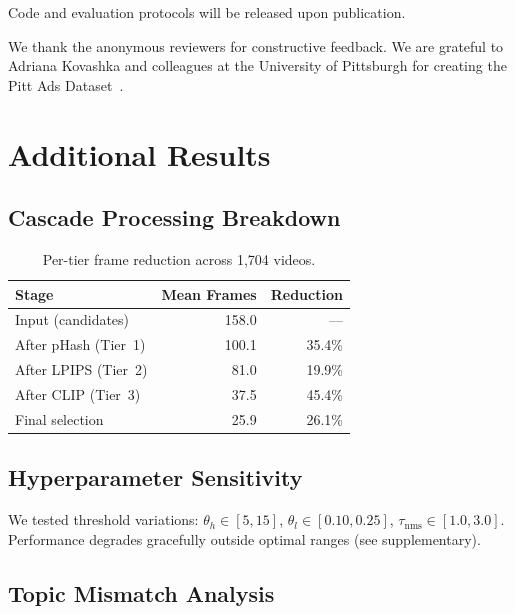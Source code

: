 \documentclass[sigconf,nonacm]{acmart}
\begin{document}
Code and evaluation protocols will be released upon publication.

\begin{acks}
We thank the anonymous reviewers for constructive feedback. We are grateful to Adriana Kovashka and colleagues at the University of Pittsburgh for creating the Pitt Ads Dataset~\cite{hussain2017automatic}.
\end{acks}




\appendix

\section{Additional Results}

\subsection{Cascade Processing Breakdown}

\begin{table}[h]
\centering
\caption{Per-tier frame reduction across 1,704 videos.}
\label{tab:cascade_stats}
\begin{tabular}{@{}lrr@{}}
\toprule
\textbf{Stage} & \textbf{Mean Frames} & \textbf{Reduction} \\
\midrule
Input (candidates)   & 158.0 & --- \\
After pHash (Tier~1) & 100.1 & 35.4\% \\
After LPIPS (Tier~2) &  81.0 & 19.9\% \\
After CLIP (Tier~3)  &  37.5 & 45.4\% \\
Final selection      &  25.9 & 26.1\% \\
\bottomrule
\end{tabular}
\end{table}

\subsection{Hyperparameter Sensitivity}

We tested threshold variations: $\theta_h \in [5, 15]$, $\theta_l \in [0.10, 0.25]$, $\tau_{\text{nms}} \in [1.0, 3.0]$. Performance degrades gracefully outside optimal ranges (see supplementary).

\subsection{Topic Mismatch Analysis}
\end{document}
